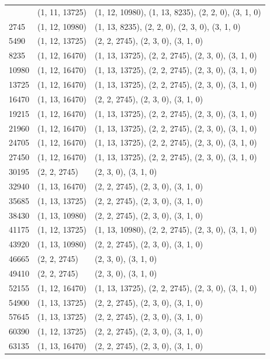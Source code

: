 \begin{center}
\begin{longtable}{|l|l|l|}
\hline \hline
\endlastfoot
0 & (1, 11, 13725) & (1, 12, 10980), (1, 13, 8235), (2, 2, 0), (3, 1, 0) \\
2745 & (1, 12, 10980) & (1, 13, 8235), (2, 2, 0), (2, 3, 0), (3, 1, 0) \\
5490 & (1, 12, 13725) & (2, 2, 2745), (2, 3, 0), (3, 1, 0) \\
8235 & (1, 12, 16470) & (1, 13, 13725), (2, 2, 2745), (2, 3, 0), (3, 1, 0) \\
10980 & (1, 12, 16470) & (1, 13, 13725), (2, 2, 2745), (2, 3, 0), (3, 1, 0) \\
13725 & (1, 12, 16470) & (1, 13, 13725), (2, 2, 2745), (2, 3, 0), (3, 1, 0) \\
16470 & (1, 13, 16470) & (2, 2, 2745), (2, 3, 0), (3, 1, 0) \\
19215 & (1, 12, 16470) & (1, 13, 13725), (2, 2, 2745), (2, 3, 0), (3, 1, 0) \\
21960 & (1, 12, 16470) & (1, 13, 13725), (2, 2, 2745), (2, 3, 0), (3, 1, 0) \\
24705 & (1, 12, 16470) & (1, 13, 13725), (2, 2, 2745), (2, 3, 0), (3, 1, 0) \\
27450 & (1, 12, 16470) & (1, 13, 13725), (2, 2, 2745), (2, 3, 0), (3, 1, 0) \\
30195 & (2, 2, 2745) & (2, 3, 0), (3, 1, 0) \\
32940 & (1, 13, 16470) & (2, 2, 2745), (2, 3, 0), (3, 1, 0) \\
35685 & (1, 13, 13725) & (2, 2, 2745), (2, 3, 0), (3, 1, 0) \\
38430 & (1, 13, 10980) & (2, 2, 2745), (2, 3, 0), (3, 1, 0) \\
41175 & (1, 12, 13725) & (1, 13, 10980), (2, 2, 2745), (2, 3, 0), (3, 1, 0) \\
43920 & (1, 13, 10980) & (2, 2, 2745), (2, 3, 0), (3, 1, 0) \\
46665 & (2, 2, 2745) & (2, 3, 0), (3, 1, 0) \\
49410 & (2, 2, 2745) & (2, 3, 0), (3, 1, 0) \\
52155 & (1, 12, 16470) & (1, 13, 13725), (2, 2, 2745), (2, 3, 0), (3, 1, 0) \\
54900 & (1, 13, 13725) & (2, 2, 2745), (2, 3, 0), (3, 1, 0) \\
57645 & (1, 13, 13725) & (2, 2, 2745), (2, 3, 0), (3, 1, 0) \\
60390 & (1, 12, 13725) & (2, 2, 2745), (2, 3, 0), (3, 1, 0) \\
63135 & (1, 13, 16470) & (2, 2, 2745), (2, 3, 0), (3, 1, 0) \\

\end{longtable}
\end{center}
